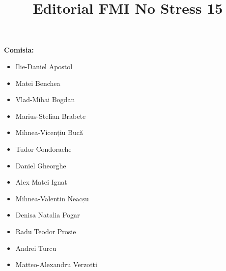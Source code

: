 \documentclass{article}
\begin{document}
	
    \newtheorem{theorem}{Teoremă}[section]
    \newtheorem{corollary}{Corollary}[theorem]
    \newtheorem*{remark}{Observație}
 
    \title{Editorial FMI No Stress 15}
	\author{}
	\date{}
	\maketitle
	
    \tableofcontents

    \newpage
    
    \newpage

    
    \newpage

    
    \newpage

    
    \newpage

    
    \newpage

    
    \newpage

    
    \newpage
    
    
    \newpage

    
    \newpage

    
    \newpage

    
    \newpage

    
    \newpage

    
    \newpage

    
    \newpage

    {\large\textbf{Comisia:}}
	\begin{itemize}
	    \item Ilie-Daniel Apostol
	    \item Matei Benchea
	    \item Vlad-Mihai Bogdan
	    \item Marius-Stelian Brabete
	    \item Mihnea-Vicențiu Bucă
	    \item Tudor Condorache
	    \item Daniel Gheorghe
	    \item Alex Matei Ignat
            \item Mihnea-Valentin Neacșu
	    \item Denisa Natalia Pogar
	    \item Radu Teodor Prosie
	    \item Andrei Turcu
	    \item Matteo-Alexandru Verzotti
	\end{itemize}
    \newpage
\end{document}
